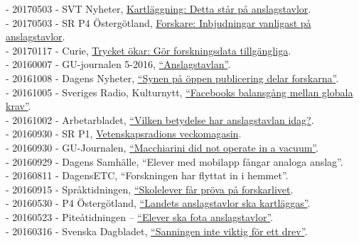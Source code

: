 \documentclass[a4paper,11pt,oneside]{article}
\begin{document}
{    %
    - 20170503 - SVT Nyheter, \href{https://www.svt.se/nyheter/lokalt/vast/elever-har-kartlagt-anslagstavlor-i-hela-landet}{Kartläggning: Detta står på anslagstavlor}. \\
    - 20170503 - SR P4 Östergötland, \href{http://t.sr.se/2pdhEBb}{Forskare: Inbjudningar vanligast på anslagstavlor}.\\
    - 20170117 - Curie, \href{http://www.tidningencurie.se/nyheter/2017/01/17/trycket-okar-gor-forskningsdata-tillgangliga/}{Trycket ökar: Gör forskningsdata tillgängliga}.\\
    - 20160007 - GU-journalen 5-2016, \href{https://issuu.com/universityofgothenburg/docs/gu-journalen5-2016/34}{``Anslagstavlan''}.\\
    - 20161008 - Dagens Nyheter, \href{http://www.dn.se/nyheter/sverige/synen-pa-oppen-publicering-delar-forskarna/}{``Synen på öppen publicering delar forskarna''}.\\
    - 20161005 - Sveriges Radio, Kulturnytt, \href{http://sverigesradio.se/sida/artikel.aspx?programid=478&artikel=6533649}{``Facebooks balansgång mellan globala krav''}.\\
    - 20161002 - Arbetarbladet, \href{http://www.arbetarbladet.se/gavleborg/sandviken/vilken-betydelse-har-anslagstavlan-i-dag}{``Vilken betydelse har anslagstavlan idag?}.\\
    - 20160930 - SR P1, \href{http://t.sr.se/2dszL0a}{Vetenskapsradions veckomagasin}.\\
    - 20160930 - GU-Journalen, \href{https://issuu.com/universityofgothenburg/docs/guj4-2016}{``Macchiarini did not operate in a vacuum''}.\\
    - 20160929 - Dagens Samhälle, ``Elever med mobilapp fångar analoga anslag''.\\
    - 20160811 - DagensETC, ``Forskningen har flyttat in i hemmet''. \\
    - 20160915 - Språktidningen, \href{http://spraktidningen.se/blogg/skolelever-far-prova-pa-forskarlivet}{``Skolelever får pröva på forskarlivet}.\\
    - 20160530 - P4 Östergötland, \href{http://t.sr.se/1NY9nMZ}{``Landets anslagstavlor ska kartläggas''}. \\
    - 20160523 - Piteåtidningen – \href{http://www.pt.se/nyheter/pitea/elever-ska-fota-anslagstavlor-10045575.aspx}{``Elever ska fota anslagstavlor''}. \\
    - 20160316 - Svenska Dagbladet, \href{http://www.svd.se/sanning-inte-viktigt-for-ett-drev/om/natdrev}{``Sanningen inte viktig för ett drev''}. \\
}
\end{document}

